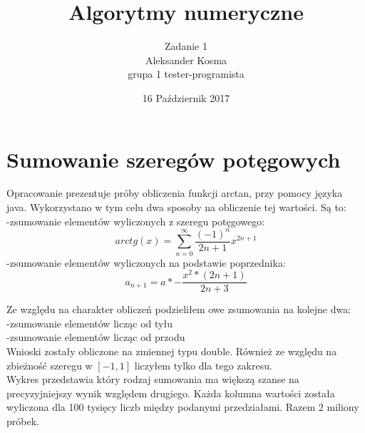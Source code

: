 \documentclass[10pt]{article}
\title{Algorytmy numeryczne}
\author{Zadanie 1 \\ Aleksander Kosma\\grupa 1 tester-programista}
\date{16 Październik 2017}
\begin{document}
\maketitle 

\section{Sumowanie szeregów potęgowych}



Opracowanie prezentuje próby obliczenia funkcji arctan, przy pomocy języka java.
Wykorzystano w tym celu dwa sposoby na obliczenie tej wartości. Są to:\\
-zsumowanie elementów wyliczonych z szeregu potęgowego:\\
$$arctg(x) = \sum_{n=0}^{\infty}\frac{(-1)^n}{2n + 1} x^{2n + 1}$$
-zsumowanie elementów wyliczonych na podstawie poprzednika:\\
$$a_{n+1}= a *-\frac{x^2 * (2n + 1)}{2n + 3}$$

Ze względu na charakter obliczeń podzieliłem owe zsumowania na kolejne dwa:\\
-zsumowanie elementów licząc od tyłu\\
-zsumowanie elementów licząc od przodu\\

Wnioski zostały obliczone na zmiennej typu double. Również ze względu na zbieżność szeregu w $[-1,1]$ 
liczyłem tylko dla tego zakresu.\\

Wykres przedstawia który rodzaj sumowania ma większą szanse na precyzyjniejszy wynik względem drugiego.
Każda kolumna wartości została wyliczona dla 100 tysięcy liczb między podanymi przedziałami. Razem 2 miliony próbek.\\


\begin{center}
\end{center}
\end{document}
